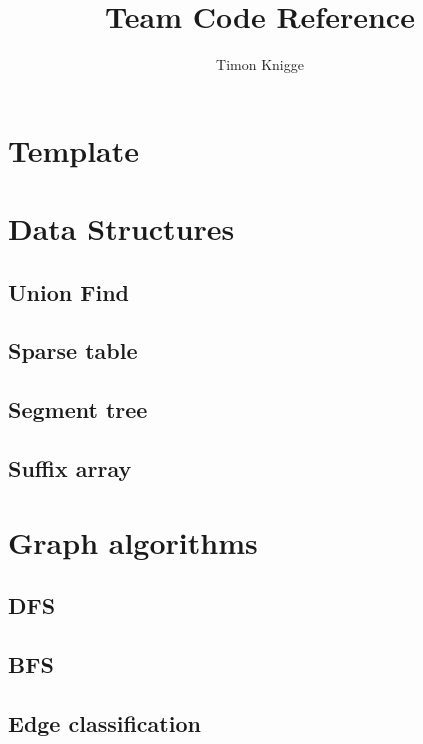 \documentclass[a4paper]{article}
\title{Team Code Reference}
\author{
    Timon Knigge
}
\newcommand{\includesnippet}[2]{

}
\begin{document}
  \maketitle
  \tableofcontents
  \clearpage
    
  \section{Template}
    \includesnippet{snippets/header.h}{C++}
    
  \section{Data Structures}
    
    \subsection{Union Find}
    \includesnippet{snippets/unionfind.cpp}{C++}
    
    \subsection{Sparse table}
    
    \subsection{Segment tree}
    
    \subsection{Suffix array}
    
  \section{Graph algorithms}
  
    \subsection{DFS}
    
    \subsection{BFS}
    
    \subsection{Edge classification}
    
\end{document}

